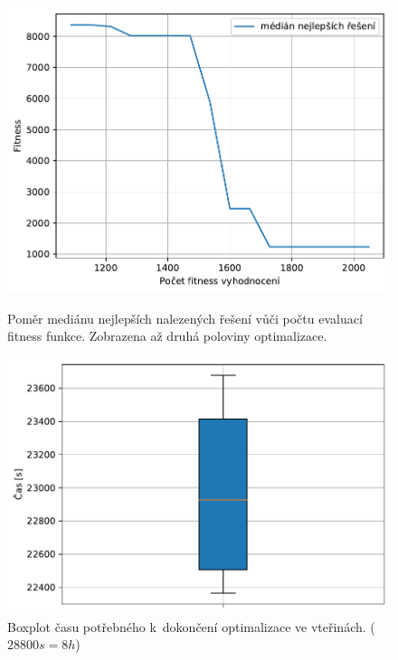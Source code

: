 \begin{figure}[H]

\begin{minipage}[t]{0.475\linewidth}
	\includegraphics[width=\textwidth]{obrazky-figures/statistics/HIFU/blob/20/PSO/bestsToFitness_1.pdf}
	\caption{Poměr mediánu nejlepších nalezených řešení vůči počtu evaluací fitness funkce. Zobrazena až druhá poloviny optimalizace.}
	\label{fg:hifu:blob:pso:fitPerf}
\end{minipage}
\hfill
\begin{minipage}[t]{0.475\linewidth}
\includegraphics[width=\linewidth]{obrazky-figures/statistics/HIFU/blob/20/PSO/timeBoxplot_WithOutliers.pdf}
\caption{Boxplot času potřebného k~dokončení optimalizace ve vteřinách. ($28800s = 8h$)}
\label{fg:hifu:blob:pso:time}
\end{minipage}
\end{figure}


